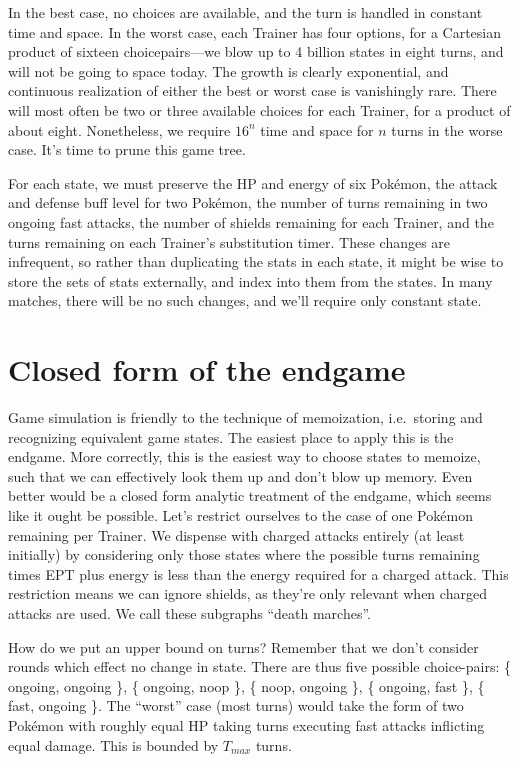 In the best case, no choices are available, and the turn is handled in constant
  time and space.
In the worst case, each Trainer has four options, for a Cartesian product
  of sixteen choicepairs---we blow up to 4 billion states in eight turns,
  and will not be going to space today.
The growth is clearly exponential, and continuous realization of either the
  best or worst case is vanishingly rare.
There will most often be two or three available choices for each Trainer,
  for a product of about eight.
Nonetheless, we require $16^n$ time and space for $n$ turns in the worse case.
It's time to prune this game tree.

For each state, we must preserve the HP and energy of six Pokémon,
  the attack and defense buff level for two Pokémon,
  the number of turns remaining in two ongoing fast attacks,
  the number of shields remaining for each Trainer,
  and the turns remaining on each Trainer's substitution timer.
These changes are infrequent, so rather than duplicating the stats in
  each state, it might be wise to store the sets of stats externally,
  and index into them from the states.
In many matches, there will be no such changes, and we'll require
  only constant state.

\section{Closed form of the endgame}
Game simulation is friendly to the technique of memoization, i.e.\ storing
  and recognizing equivalent game states.
The easiest place to apply this is the endgame.
More correctly, this is the easiest way to choose states to memoize,
  such that we can effectively look them up and don't blow up memory.
Even better would be a closed form analytic treatment of the endgame,
  which seems like it ought be possible.
Let's restrict ourselves to the case of one Pokémon remaining per Trainer.
We dispense with charged attacks entirely (at least initially) by considering
  only those states where the possible turns remaining times EPT plus
  energy is less than the energy required for a charged attack.
This restriction means we can ignore shields, as they're only relevant
  when charged attacks are used.
We call these subgraphs ``death marches''.

How do we put an upper bound on turns?
Remember that we don't consider rounds which effect no change in state.
There are thus five possible choice-pairs:
  \{ ongoing, ongoing \},
  \{ ongoing, noop \},
  \{ noop, ongoing \},
  \{ ongoing, fast \},
  \{ fast, ongoing \}.
The ``worst'' case (most turns) would take the form of two Pokémon
  with roughly equal HP taking turns executing fast attacks
  inflicting equal damage.
This is bounded by $T_{max}$ turns.

